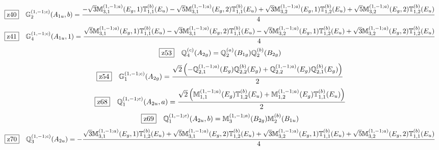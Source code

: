 \documentclass[fleqn,10pt,landscape]{jsarticle}
\begin{document}
\begin{dmath*}
\hspace*{3mm}\fbox{z40}\quad \mathbb{G}_{2}^{(1,-1;c)}(A_{1u},b)=\frac{- \sqrt{3} \mathbb{M}_{3,1}^{(1,-1;a)}(E_{g},1) \mathbb{T}_{1,1}^{(b)}(E_{u}) - \sqrt{5} \mathbb{M}_{3,1}^{(1,-1;a)}(E_{g},2) \mathbb{T}_{1,1}^{(b)}(E_{u}) + \sqrt{3} \mathbb{M}_{3,2}^{(1,-1;a)}(E_{g},1) \mathbb{T}_{1,2}^{(b)}(E_{u}) + \sqrt{5} \mathbb{M}_{3,2}^{(1,-1;a)}(E_{g},2) \mathbb{T}_{1,2}^{(b)}(E_{u})}{4}
\end{dmath*}
\begin{dmath*}
\hspace*{3mm}\fbox{z41}\quad \mathbb{G}_{4}^{(1,-1;c)}(A_{1u},1)=\frac{\sqrt{5} \mathbb{M}_{3,1}^{(1,-1;a)}(E_{g},1) \mathbb{T}_{1,1}^{(b)}(E_{u}) - \sqrt{3} \mathbb{M}_{3,1}^{(1,-1;a)}(E_{g},2) \mathbb{T}_{1,1}^{(b)}(E_{u}) - \sqrt{5} \mathbb{M}_{3,2}^{(1,-1;a)}(E_{g},1) \mathbb{T}_{1,2}^{(b)}(E_{u}) + \sqrt{3} \mathbb{M}_{3,2}^{(1,-1;a)}(E_{g},2) \mathbb{T}_{1,2}^{(b)}(E_{u})}{4}
\end{dmath*}
\begin{dmath*}
\hspace*{3mm}\fbox{z53}\quad \mathbb{Q}_{4}^{(c)}(A_{2g})=\mathbb{Q}_{2}^{(a)}(B_{1g}) \mathbb{Q}_{2}^{(b)}(B_{2g})
\end{dmath*}
\begin{dmath*}
\hspace*{3mm}\fbox{z54}\quad \mathbb{G}_{1}^{(1,-1;c)}(A_{2g})=\frac{\sqrt{2} \left(- \mathbb{Q}_{2,1}^{(1,-1;a)}(E_{g}) \mathbb{Q}_{2,2}^{(b)}(E_{g}) + \mathbb{Q}_{2,2}^{(1,-1;a)}(E_{g}) \mathbb{Q}_{2,1}^{(b)}(E_{g})\right)}{2}
\end{dmath*}
\begin{dmath*}
\hspace*{3mm}\fbox{z68}\quad \mathbb{Q}_{1}^{(1,-1;c)}(A_{2u},a)=\frac{\sqrt{2} \left(\mathbb{M}_{1,1}^{(1,-1;a)}(E_{g}) \mathbb{T}_{1,2}^{(b)}(E_{u}) + \mathbb{M}_{1,2}^{(1,-1;a)}(E_{g}) \mathbb{T}_{1,1}^{(b)}(E_{u})\right)}{2}
\end{dmath*}
\begin{dmath*}
\hspace*{3mm}\fbox{z69}\quad \mathbb{Q}_{1}^{(1,-1;c)}(A_{2u},b)=\mathbb{M}_{3}^{(1,-1;a)}(B_{2g}) \mathbb{M}_{2}^{(b)}(B_{1u})
\end{dmath*}
\begin{dmath*}
\hspace*{3mm}\fbox{z70}\quad \mathbb{Q}_{3}^{(1,-1;c)}(A_{2u})=- \frac{\sqrt{3} \mathbb{M}_{3,1}^{(1,-1;a)}(E_{g},1) \mathbb{T}_{1,2}^{(b)}(E_{u}) + \sqrt{5} \mathbb{M}_{3,1}^{(1,-1;a)}(E_{g},2) \mathbb{T}_{1,2}^{(b)}(E_{u}) + \sqrt{3} \mathbb{M}_{3,2}^{(1,-1;a)}(E_{g},1) \mathbb{T}_{1,1}^{(b)}(E_{u}) + \sqrt{5} \mathbb{M}_{3,2}^{(1,-1;a)}(E_{g},2) \mathbb{T}_{1,1}^{(b)}(E_{u})}{4}
\end{dmath*}
\end{document}
